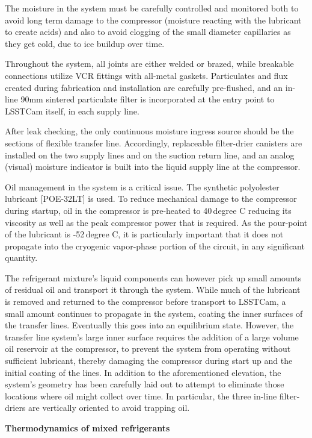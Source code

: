The moisture in the system must be carefully controlled and monitored both to avoid long term damage to the compressor (moisture reacting with the lubricant to create acids) and also to avoid clogging of the small diameter capillaries as they get cold, due to ice buildup over time.

Throughout the system, all joints are either welded or brazed, while breakable connections utilize VCR fittings with all-metal gaskets. Particulates and flux created during fabrication and installation are carefully pre-flushed, and an in-line 90mm sintered particulate filter is incorporated at the entry point to LSSTCam itself, in each supply line.

After leak checking, the only continuous moisture ingress source should be the sections of flexible transfer line. Accordingly, replaceable filter-drier canisters are installed on the two supply lines and on the suction return line, and an analog (visual) moisture indicator is built into the liquid supply line at the compressor.

Oil management in the system is a critical issue. The synthetic polyolester lubricant {[}POE-32LT{]} is used. To reduce mechanical damage to the compressor during startup, oil in the compressor is pre-heated to 40\,degree C reducing its viscosity as well as the peak compressor power that is required. As the pour-point of the lubricant is -52\,degree C, it is particularly important that it does not propagate into the cryogenic vapor-phase portion of the circuit, in any significant quantity.

The refrigerant mixture's liquid components can however pick up small amounts of residual oil and transport it through the system. While much of the lubricant is removed and returned to the compressor before transport to LSSTCam, a small amount continues to propagate in the system, coating the inner surfaces of the transfer lines. Eventually this goes into an equilibrium state. However, the transfer line system's large inner surface requires the addition of a large volume oil reservoir at the compressor, to prevent the system from operating without sufficient lubricant, thereby damaging the compressor during start up and the initial coating of the lines. In addition to the aforementioned elevation, the system's geometry has been carefully laid out to attempt to eliminate those locations where oil might collect over time. In particular, the three in-line filter-driers are vertically oriented to avoid trapping oil.

\textbf{Thermodynamics of mixed refrigerants}

